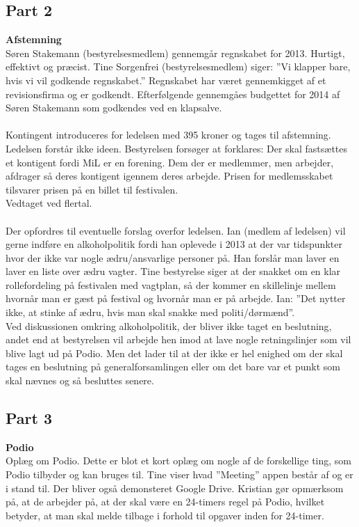 \subsection{Part 2}
\label{ws2}
\noindent \textbf{Afstemning} \\
Søren Stakemann (bestyrelsesmedlem) gennemgår regnskabet for 2013. Hurtigt, effektivt og præcist. Tine Sorgenfrei (bestyrelsesmedlem) siger: ”Vi klapper bare, hvis vi vil godkende regnskabet.” Regnskabet har været gennemkigget af et revisionsfirma og er godkendt. Efterfølgende  gennemgåes budgettet for 2014 af Søren Stakemann som godkendes ved en klapsalve.
\\ \\
Kontingent introduceres for ledelsen med 395 kroner og tages til afstemning. Ledelsen forstår ikke ideen. Bestyrelsen forsøger at forklares: Der skal fastsættes et kontigent fordi MiL er en forening. Dem der er medlemmer, men arbejder, afdrager så deres kontigent igennem deres arbejde. Prisen for medlemsskabet tilsvarer prisen på en billet til festivalen. \\ Vedtaget ved flertal.
\\ \\
Der opfordres til eventuelle forslag overfor ledelsen. Ian (medlem af ledelsen) vil gerne indføre en alkoholpolitik fordi han oplevede i 2013 at der var tidspunkter hvor der ikke var nogle ædru/ansvarlige personer på. Han forslår man laver en laver en liste over ædru vagter.
Tine bestyrelse siger at der snakket om en klar rollefordeling på festivalen med vagtplan, så der kommer en skillelinje mellem hvornår man er gæst på festival og hvornår man er på arbejde.
Ian: ”Det nytter ikke, at stinke af ædru, hvis man skal snakke med politi/dørmænd”. 
\\
Ved diskussionen omkring alkoholpolitik, der bliver ikke taget en beslutning, andet end at bestyrelsen vil arbejde hen imod at lave nogle retningslinjer som vil blive lagt ud på Podio. Men det lader til at der ikke er hel enighed om der skal tages en beslutning på generalforsamlingen eller om det bare var et punkt som skal nævnes og så besluttes senere.

\subsection{Part 3}
\label{ws3}
\noindent \textbf{Podio} \\
Oplæg om Podio. Dette er blot et kort oplæg om nogle af de forskellige ting, som Podio tilbyder og kan bruges til. Tine viser hvad ”Meeting” appen består af og er i stand til. Der bliver også demonsteret Google Drive. Kristian gør opmærksom på, at de arbejder på, at der skal være en 24-timers regel på Podio, hvilket betyder, at man skal melde tilbage i forhold til opgaver inden for 24-timer.

